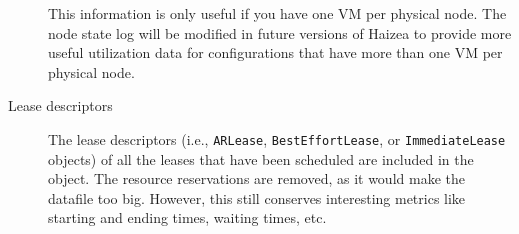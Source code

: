 \begin{description}
\begin{itemize}
\end{itemize}
      This information is only useful if you have one VM per physical node. The node state log will be modified in future versions of Haizea to provide more useful utilization data for configurations that have more than one VM per physical node.
\item[Lease descriptors] The lease descriptors (i.e., \texttt{ARLease}, \texttt{BestEffortLease}, or \texttt{ImmediateLease} objects) of all the leases that have been scheduled are included in the object. The resource reservations are removed, as it would make the datafile too big. However, this still conserves interesting metrics like starting and ending times, waiting times, etc.
\end{description}
